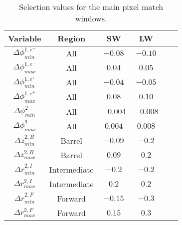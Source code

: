 \begin{table}[!hbt]
  \begin{center}
    \begin{tabular}{cc|cccc}
      \hline
      Variable                   & Region       & SW       & LW       \\
      \hline
      $\Delta\phi^{1,e^-}_{min}$ & All          & $-0.08 $ & $-0.10 $ \\
      $\Delta\phi^{1,e^-}_{max}$ & All          & $ 0.04 $ & $ 0.05 $ \\
      $\Delta\phi^{1,e^+}_{min}$ & All          & $-0.04 $ & $-0.05 $ \\
      $\Delta\phi^{1,e^+}_{max}$ & All          & $ 0.08 $ & $ 0.10 $ \\
      $\Delta\phi^{2}_{min}$     & All          & $-0.004$ & $-0.008$ \\
      $\Delta\phi^{2}_{max}$     & All          & $ 0.004$ & $ 0.008$ \\
      \hline
      $\Delta z^{2,B}_{min}$     & Barrel       & $-0.09 $ & $-0.2  $ \\
      $\Delta z^{2,B}_{max}$     & Barrel       & $ 0.09 $ & $ 0.2  $ \\
      $\Delta r^{2,I}_{min}$     & Intermediate & $-0.2  $ & $-0.2  $ \\
      $\Delta r^{2,I}_{max}$     & Intermediate & $ 0.2  $ & $ 0.2  $ \\
      $\Delta r^{2,F}_{min}$     & Forward      & $-0.15 $ & $-0.3  $ \\
      $\Delta r^{2,F}_{max}$     & Forward      & $ 0.15 $ & $ 0.3  $ \\
      \hline
    \end{tabular}
    \caption{Selection values for the main pixel match windows.}
    \label{tab:window_definitions}
  \end{center}
\end{table}